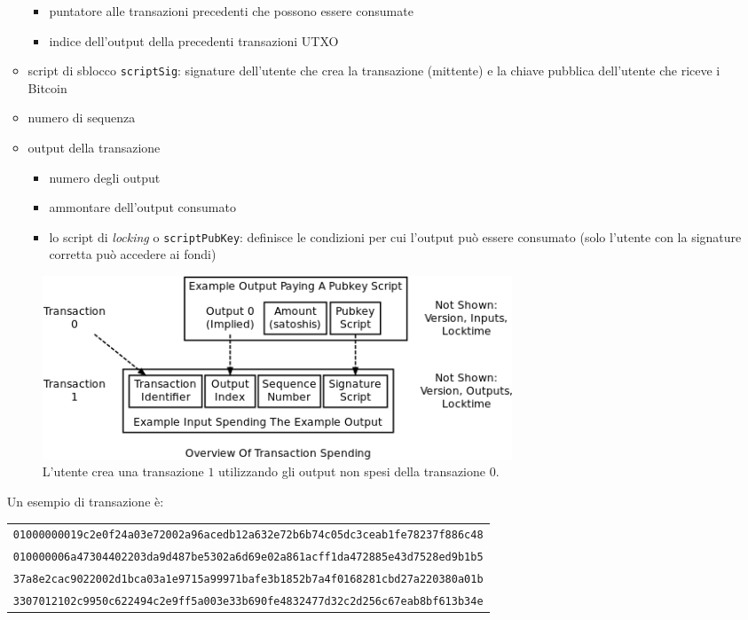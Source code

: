 \begin{enumerate}[1.]
\begin{itemize}
\begin{itemize}
            \item puntatore alle transazioni precedenti che possono essere consumate
            \item indice dell'output della precedenti transazioni UTXO
        \end{itemize}
    \item script di sblocco \texttt{scriptSig}: signature dell'utente che crea la transazione (mittente) e la chiave pubblica dell'utente che riceve i Bitcoin
    \item numero di sequenza
    \item output della transazione
        \begin{itemize}
            \item numero degli output
            \item ammontare dell'output consumato
            \item lo script di \textit{locking} o \texttt{scriptPubKey}: definisce le condizioni per cui l'output può essere consumato (solo l'utente con la signature corretta può accedere ai fondi)
        \end{itemize}
\end{itemize}
\begin{figure}[H]
    \centering
    \includegraphics[width=0.7\textwidth]{./images/example-tx.png}
    \caption{L'utente crea una transazione $1$ utilizzando gli output non spesi della transazione $0$.}
\end{figure}
Un esempio di transazione è:
\begin{table}[H]
    \begin{tabular}{l}
        \texttt{01000000019c2e0f24a03e72002a96acedb12a632e72b6b74c05dc3ceab1fe78237f886c48}\\
        \texttt{010000006a47304402203da9d487be5302a6d69e02a861acff1da472885e43d7528ed9b1b5}\\
        \texttt{37a8e2cac9022002d1bca03a1e9715a99971bafe3b1852b7a4f0168281cbd27a220380a01b}\\
        \texttt{3307012102c9950c622494c2e9ff5a003e33b690fe4832477d32c2d256c67eab8bf613b34e}\\

\end{tabular}
\end{table}
\end{enumerate}
